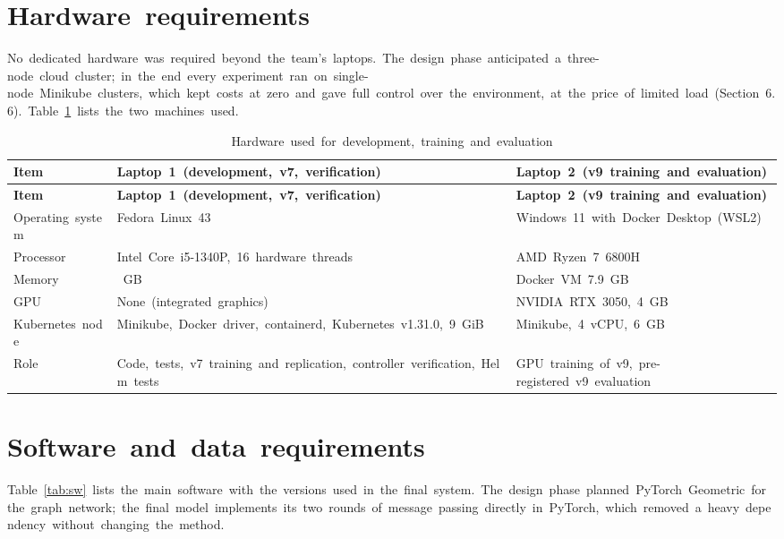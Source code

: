 \documentclass[12pt,a4paper,oneside]{report}
\begin{document}
\section{Hardware~requirements}

No~dedicated~hardware~was~required~beyond~the~team's~laptops.~The~design~phase~anticipated~a~three-node~cloud~cluster;~in~the~end~every~experiment~ran~on~single-node~Minikube~clusters,~which~kept~costs~at~zero~and~gave~full~control~over~the~environment,~at~the~price~of~limited~load~(Section~6.6).~Table~\ref{tab:hw}~lists~the~two~machines~used.


\begingroup\small\setlength{\tabcolsep}{4pt}\renewcommand{\arraystretch}{1.25}
\begin{longtable}{|>{\raggedright\arraybackslash}p{2.91cm}|>{\raggedright\arraybackslash}p{5.82cm}|>{\raggedright\arraybackslash}p{5.82cm}|}
\caption{Hardware~used~for~development,~training~and~evaluation}\label{tab:hw}\\\hline
\textbf{Item} & \textbf{Laptop~1~(development,~v7,~verification)} & \textbf{Laptop~2~(v9~training~and~evaluation)}\\\hline\endfirsthead
\hline \textbf{Item} & \textbf{Laptop~1~(development,~v7,~verification)} & \textbf{Laptop~2~(v9~training~and~evaluation)}\\\hline\endhead
Operating~system & Fedora~Linux~43 & Windows~11~with~Docker~Desktop~(WSL2)\\\hline
Processor & Intel~Core~i5-1340P,~16~hardware~threads & AMD~Ryzen~7~6800H\\\hline
Memory & 16~GB & Docker~VM~7.9~GB\\\hline
GPU & None~(integrated~graphics) & NVIDIA~RTX~3050,~4~GB\\\hline
Kubernetes~node & Minikube,~Docker~driver,~containerd,~Kubernetes~v1.31.0,~9~GiB & Minikube,~4~vCPU,~6~GB\\\hline
Role & Code,~tests,~v7~training~and~replication,~controller~verification,~Helm~tests & GPU~training~of~v9,~pre-registered~v9~evaluation\\\hline
\end{longtable}\endgroup

\section{Software~and~data~requirements}

Table~\ref{tab:sw}~lists~the~main~software~with~the~versions~used~in~the~final~system.~The~design~phase~planned~PyTorch~Geometric~for~the~graph~network;~the~final~model~implements~its~two~rounds~of~message~passing~directly~in~PyTorch,~which~removed~a~heavy~dependency~without~changing~the~method.
\end{document}

